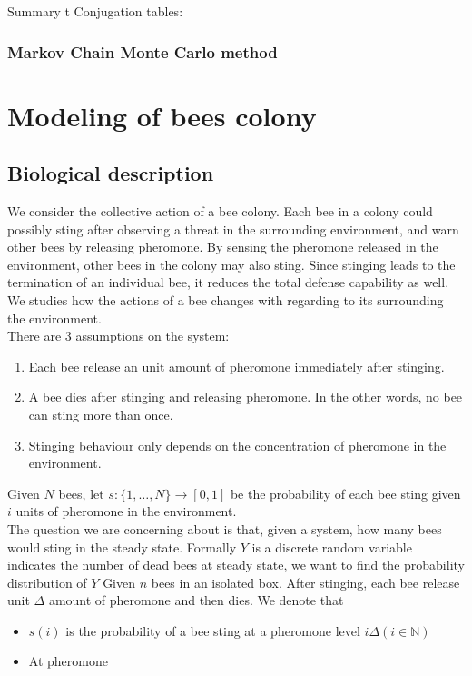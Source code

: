 \documentclass[12pt]{article}
\begin{document}
Summary t
Conjugation tables:
\subsubsection{Markov Chain Monte Carlo method}
\sub
 

\section{Modeling of bees colony}
\subsection{Biological description}
We consider the collective action of a bee colony. Each bee in a colony could
possibly sting after observing a threat in the surrounding environment, and warn
other bees by releasing pheromone. By sensing the pheromone released in the
environment, other bees in the colony may also sting. Since stinging leads to
the termination of an individual bee, it reduces the total defense capability as
well. We studies how the actions of a bee changes with regarding to its
surrounding the environment.\\
There are 3 assumptions on the system:
\begin{enumerate}
\item Each bee release an unit amount of pheromone immediately after stinging.
\item A bee dies after stinging and releasing pheromone. In the other words, no
  bee can sting more than once.
\item Stinging behaviour only depends on the concentration of pheromone in the
  environment.
\end{enumerate}
Given $N$ bees, let $s:\{1,\ldots,N\}\rightarrow[0,1]$ be the probability of
each bee sting given $i$ units of pheromone in the environment.\\

The question we are concerning about is that, given a system, how many bees
would sting in the steady state. Formally $Y$ is a discrete random variable
indicates the number of dead bees at steady state, we want to find the
probability distribution of $Y$ Given $n$ bees in an isolated box. After
stinging, each bee release unit $\Delta$ amount of pheromone and then dies. We
denote that
\begin{itemize}
\item $s(i)$ is the probability of a bee sting at a pheromone level $i\Delta
  (i\in \mathbb{N})$
\item At pheromone 
\end{itemize}
\end{document}
